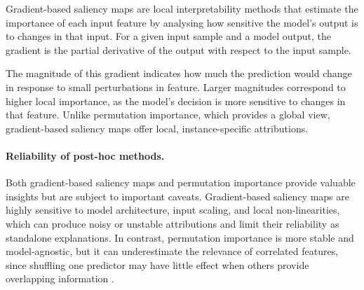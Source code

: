 Gradient-based saliency maps \citep{Selvaraju2017} are local interpretability methods that estimate the importance of each input feature by analysing how sensitive the model's output is to changes in that input. For a given input sample and a model output, the gradient is the partial derivative of the output with respect to the input sample.

The magnitude of this gradient indicates how much the prediction would change in response to small perturbations in feature. Larger magnitudes correspond to higher local importance, as the model's decision is more sensitive to changes in that feature. Unlike permutation importance, which provides a global view, gradient-based saliency maps offer local, instance-specific attributions.


\paragraph{Reliability of post-hoc methods.}
Both gradient-based saliency maps and permutation importance provide valuable insights but are subject to important caveats. Gradient-based saliency maps are highly sensitive to model architecture, input scaling, and local non-linearities, which can produce noisy or unstable attributions and limit their reliability as standalone explanations. In contrast, permutation importance is more stable and model-agnostic, but it can underestimate the relevance of correlated features, since shuffling one predictor may have little effect when others provide overlapping information \citep{molnar2025}.




